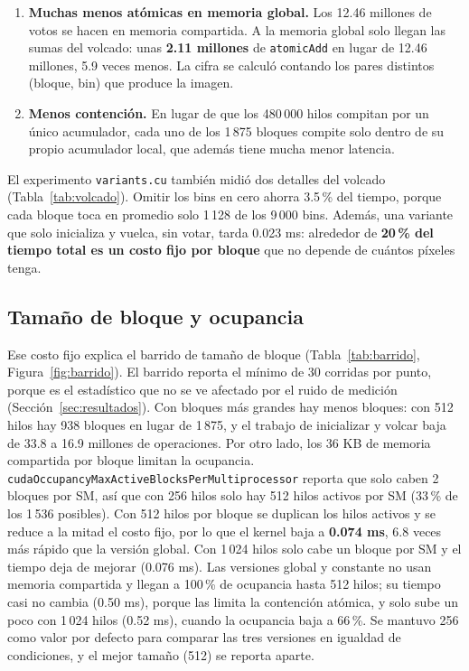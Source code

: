 \begin{enumerate}
  \item \textbf{Muchas menos atómicas en memoria global.} Los 12.46 millones de votos se hacen en memoria compartida. A la memoria global solo llegan las sumas del volcado: unas \textbf{2.11 millones} de \texttt{atomicAdd} en lugar de 12.46 millones, 5.9 veces menos. La cifra se calculó contando los pares distintos (bloque, bin) que produce la imagen.
  \item \textbf{Menos contención.} En lugar de que los 480\,000 hilos compitan por un único acumulador, cada uno de los 1\,875 bloques compite solo dentro de su propio acumulador local, que además tiene mucha menor latencia.
\end{enumerate}

El experimento \texttt{variants.cu} también midió dos detalles del volcado (Tabla~\ref{tab:volcado}). Omitir los bins en cero ahorra 3.5\,\% del tiempo, porque cada bloque toca en promedio solo 1\,128 de los 9\,000 bins. Además, una variante que solo inicializa y vuelca, sin votar, tarda 0.023 ms: alrededor de \textbf{20\,\% del tiempo total es un costo fijo por bloque} que no depende de cuántos píxeles tenga.

\begin{table}[H]
  \centering
  
  \caption{Variantes del volcado en la versión compartida (bloques de 256). La variante \texttt{solo\_init\_volcado} no vota, por eso no coincide con la CPU.}
  \label{tab:volcado}
\end{table}

\subsection{Tamaño de bloque y ocupancia}

Ese costo fijo explica el barrido de tamaño de bloque (Tabla~\ref{tab:barrido}, Figura~\ref{fig:barrido}). El barrido reporta el mínimo de 30 corridas por punto, porque es el estadístico que no se ve afectado por el ruido de medición (Sección~\ref{sec:resultados}). Con bloques más grandes hay menos bloques: con 512 hilos hay 938 bloques en lugar de 1\,875, y el trabajo de inicializar y volcar baja de 33.8 a 16.9 millones de operaciones. Por otro lado, los 36 KB de memoria compartida por bloque limitan la ocupancia. \texttt{cudaOccupancyMaxActiveBlocksPerMultiprocessor} reporta que solo caben 2 bloques por SM, así que con 256 hilos solo hay 512 hilos activos por SM (33\,\% de los 1\,536 posibles). Con 512 hilos por bloque se duplican los hilos activos y se reduce a la mitad el costo fijo, por lo que el kernel baja a \textbf{0.074 ms}, 6.8 veces más rápido que la versión global. Con 1\,024 hilos solo cabe un bloque por SM y el tiempo deja de mejorar (0.076 ms). Las versiones global y constante no usan memoria compartida y llegan a 100\,\% de ocupancia hasta 512 hilos; su tiempo casi no cambia (0.50 ms), porque las limita la contención atómica, y solo sube un poco con 1\,024 hilos (0.52 ms), cuando la ocupancia baja a 66\,\%. Se mantuvo 256 como valor por defecto para comparar las tres versiones en igualdad de condiciones, y el mejor tamaño (512) se reporta aparte.

